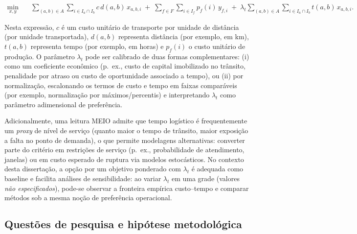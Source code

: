 \begin{align}
\min_{x,y} \quad
& \sum_{(a,b)\in A} \sum_{i \in I_a \cap I_b} c \, d(a,b)\, x_{a,b,i}
\;+\; \sum_{f\in F}\sum_{i\in I_f} p_f(i)\, y_{f,i}
\;+\; \lambda_t \sum_{(a,b)\in A} \sum_{i \in I_a \cap I_b} t(a,b)\, x_{a,b,i}.
\label{eq:obj_cost_time}
\end{align}

Nesta expressão, \(c\) é um custo unitário de transporte por unidade de distância (por unidade transportada), \(d(a,b)\) representa distância (por exemplo, em km), \(t(a,b)\) representa tempo (por exemplo, em horas) e \(p_f(i)\) o custo unitário de produção. O parâmetro \(\lambda_t\) pode ser calibrado de duas formas complementares: (i) como um coeficiente econômico (p.\ ex., custo de capital imobilizado no trânsito, penalidade por atraso ou custo de oportunidade associado a tempo), ou (ii) por normalização, escalonando os termos de custo e tempo em faixas comparáveis (por exemplo, normalização por máximos/percentis) e interpretando \(\lambda_t\) como parâmetro adimensional de preferência. \cite{SimchiLevi2009CadeiaSuprimentos,Chopra2022SCM}

Adicionalmente, uma leitura MEIO admite que tempo logístico é frequentemente um \emph{proxy} de nível de serviço (quanto maior o tempo de trânsito, maior exposição a falta no ponto de demanda), o que permite modelagens alternativas: converter parte do critério em restrições de serviço (p.\ ex., probabilidade de atendimento, janelas) ou em custo esperado de ruptura via modelos estocásticos. \cite{Axsater2006InventoryControl,Achkar2024GSMExtensions,BirgeLouveaux2011StochasticProgramming} No contexto desta dissertação, a opção por um objetivo ponderado com \(\lambda_t\) é adequada como baseline e facilita análises de sensibilidade: ao variar \(\lambda_t\) em uma grade (valores \emph{não especificados}), pode-se observar a fronteira empírica custo--tempo e comparar métodos sob a mesma noção de preferência operacional. \cite{Talbi2009Metaheuristics}

\subsection{Questões de pesquisa e hipótese metodológica}

